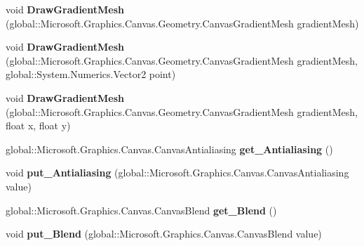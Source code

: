 \begin{DoxyCompactItemize}
void {\bfseries Draw\+Gradient\+Mesh} (global\+::\+Microsoft.\+Graphics.\+Canvas.\+Geometry.\+Canvas\+Gradient\+Mesh gradient\+Mesh)
\item 
\mbox{\label{interface_microsoft_1_1_graphics_1_1_canvas_1_1_i_canvas_drawing_session_ac32f1e75cff1b963f51f956c403b34e8}} 
void {\bfseries Draw\+Gradient\+Mesh} (global\+::\+Microsoft.\+Graphics.\+Canvas.\+Geometry.\+Canvas\+Gradient\+Mesh gradient\+Mesh, global\+::\+System.\+Numerics.\+Vector2 point)
\item 
\mbox{\label{interface_microsoft_1_1_graphics_1_1_canvas_1_1_i_canvas_drawing_session_ad88ff48a111df7cba618ec22b1f9e550}} 
void {\bfseries Draw\+Gradient\+Mesh} (global\+::\+Microsoft.\+Graphics.\+Canvas.\+Geometry.\+Canvas\+Gradient\+Mesh gradient\+Mesh, float x, float y)
\item 
\mbox{\label{interface_microsoft_1_1_graphics_1_1_canvas_1_1_i_canvas_drawing_session_a1fb286e37c6e25838689dcfc89c54256}} 
global\+::\+Microsoft.\+Graphics.\+Canvas.\+Canvas\+Antialiasing {\bfseries get\+\_\+\+Antialiasing} ()
\item 
\mbox{\label{interface_microsoft_1_1_graphics_1_1_canvas_1_1_i_canvas_drawing_session_a1ed0f4918d2b7f4236c60a91533f699c}} 
void {\bfseries put\+\_\+\+Antialiasing} (global\+::\+Microsoft.\+Graphics.\+Canvas.\+Canvas\+Antialiasing value)
\item 
\mbox{\label{interface_microsoft_1_1_graphics_1_1_canvas_1_1_i_canvas_drawing_session_a2c209e6d40098f882a765e1e27adfe8a}} 
global\+::\+Microsoft.\+Graphics.\+Canvas.\+Canvas\+Blend {\bfseries get\+\_\+\+Blend} ()
\item 
\mbox{\label{interface_microsoft_1_1_graphics_1_1_canvas_1_1_i_canvas_drawing_session_a475210a2081ecb997fc9d856df5261a6}} 
void {\bfseries put\+\_\+\+Blend} (global\+::\+Microsoft.\+Graphics.\+Canvas.\+Canvas\+Blend value)

\end{DoxyCompactItemize}
